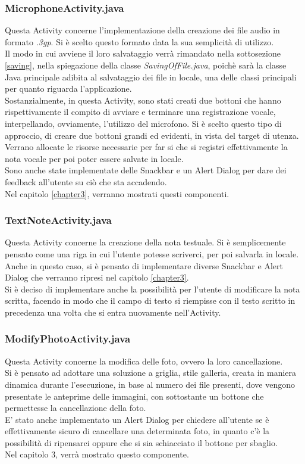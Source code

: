 \subsubsection{MicrophoneActivity.java}
Questa Activity concerne l'implementazione della creazione dei file audio in formato \textit{.3gp}. Si è scelto questo formato data la sua semplicità di utilizzo.
\\Il modo in cui avviene il loro salvataggio verrà rimandato nella sottosezione \ref{saving}, nella spiegazione della classe \textit{SavingOfFile.java}, poichè sarà la classe Java principale adibita al salvataggio dei file in locale, una delle classi principali per quanto riguarda l'applicazione.
\\Sostanzialmente, in questa Activity, sono stati creati due bottoni che hanno rispettivamente il compito di avviare e terminare una registrazione vocale, interpellando, ovviamente, l'utilizzo del microfono. Si è scelto questo tipo di approccio, di creare due bottoni grandi ed evidenti, in vista del target di utenza.
\\Verrano allocate le risorse necessarie per far si che si registri effettivamente la nota vocale per poi poter essere salvate in locale.
\\Sono anche state implementate delle Snackbar e un Alert Dialog per dare dei feedback all'utente su ciò che sta accadendo.
\\Nel capitolo \ref{chapter3}, verranno mostrati questi componenti.

\subsubsection{TextNoteActivity.java}
Questa Activity concerne la creazione della nota testuale. Si è semplicemente pensato come una riga in cui l'utente potesse scriverci, per poi salvarla in locale.
\\Anche in questo caso, si è pensato di implementare diverse Snackbar e Alert Dialog che verranno ripresi nel capitolo \ref{chapter3}.
\\Si è deciso di implementare anche la possibilità per l'utente di modificare la nota scritta, facendo in modo che il campo di testo si riempisse con il testo scritto in precedenza una volta che si entra nuovamente nell'Activity.

\subsubsection{ModifyPhotoActivity.java}
Questa Activity concerne la modifica delle foto, ovvero la loro cancellazione.
\\Si è pensato ad adottare una soluzione a griglia, stile galleria, creata in maniera dinamica durante l'esecuzione, in base al numero dei file presenti, dove vengono presentate le anteprime delle immagini, con sottostante un bottone che permettesse la cancellazione della foto.
\\E' stato anche implementato un Alert Dialog per chiedere all'utente se è effettivamente sicuro di cancellare una determinata foto, in quanto c'è la possibilità di ripensarci oppure che si sia schiacciato il bottone per sbaglio.
\\Nel capitolo 3, verrà mostrato questo componente.

